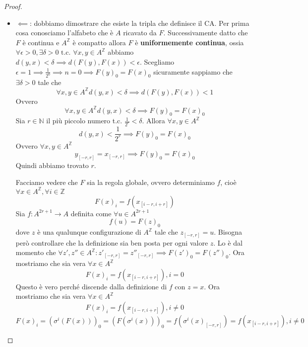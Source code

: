 \begin{teorema} 
\begin{proof}
\begin{itemize}
            Successivamente dimostriamo $F\circ \sigma = \sigma \circ F\implies F(\sigma(x)) = \sigma(F(x)), \forall x \in A^\mathbb{Z}$. 
            l'uguaglianza precedente può essere riscritta come $\forall x \in A^\mathbb{Z}, \forall i \in \mathbb{Z}, (F(\sigma(x)))_i =(\sigma(F(x)))_i$. 
            Possiamo notare che 
            $$(F(\sigma(x)))_i = f(\sigma(x)_{[i-r,i+r]})=f(x_{[i-r+1,i+r+1]})$$
            Inoltre 
            $$(\sigma(F(x)))_i =F(x)_{i+1} =f(x)_{[i+1-r,i+1+r]}$$
            Abbiamo dimostrato che commutano.
            \item $\impliedby$: dobbiamo dimostrare che esiste la tripla che definisce il CA.
            Per prima cosa conosciamo l'alfabeto che è $A$ ricavato da $F$. Successivamente
            datto che $F$ è continua e $A^\mathbb{Z}$ è compatto allora $F$ è \textbf{uniformemente 
            continua}, ossia $\forall\epsilon >0,\exists \delta > 0 \text{ t.c. } \forall x,y \in A^\mathbb{Z}$
            abbiamo $d(y,x)<\delta \implies d(F(y), F(x)) < \epsilon$. Scegliamo $\epsilon = 1\implies \frac{1}{2^0}\implies n=0\implies F(y)_0= F(x)_0$
            sicuramente sappiamo che $\exists \delta >0$ tale che $$\forall x,y \in A^\mathbb{Z} d(y,x)<\delta \implies d(F(y), F(x)) < 1$$
            Ovvero $$\forall x,y \in A^\mathbb{Z} d(y,x)<\delta \implies F(y)_0= F(x)_0$$
            Sia $r\in \mathbb{N}$ il più piccolo numero t.c. $\frac{1}{2^r}<\delta$.
            Allora $\forall x,y \in A^\mathbb{Z}$
            $$d(y,x)<\frac{1}{2^r} \implies F(y)_0= F(x)_0$$
            Ovvero $\forall x,y \in A^\mathbb{Z}$
            $$y_{[-r,r]} =x_{[-r,r]}\implies F(y)_0= F(x)_0$$
            Quindi abbiamo trovato $r$.

            Facciamo vedere che $F$ sia la regola globale, ovvero determiniamo $f$, cioè
            $\forall x\in A^\mathbb{Z},\forall i\in\mathbb{Z}$ 
            $$F(x)_i = f(x_{[i-r,i+r]})$$
            Sia $f: A^{2r+1}\rightarrow A$ definita come $\forall u \in A^{2r+1}$
            $$f(u) = F(z)_0$$ dove $z$ è una qualunque configurazione di 
            $A^\mathbb{Z}$ tale che $z_{[-r,r]} = u$. Bisogna però controllare che 
            la definizione sia ben posta per ogni valore $z$. Lo è dal momento che 
            $\forall z',z''\in A^\mathbb{Z}: z'_{[-r,r]} =  z''_{[-r,r]}\implies F(z')_0 = F(z'')_0$.
            Ora mostriamo che sia vera $\forall x\in A^\mathbb{Z}$ 
            $$F(x)_i = f(x_{[i-r,i+r]}), i = 0$$
            Questo è vero perché discende dalla definizione di $f$ con $z = x$.
            Ora mostriamo che sia vera $\forall x\in A^\mathbb{Z}$ 
            $$F(x)_i = f(x_{[i-r,i+r]}), i \ne 0$$
            $$F(x)_i = (\sigma^i(F(x)))_0=(F(\sigma^i(x)))_0=f(\sigma^i(x)_{[-r,r]}) = f(x_{[i-r,i+r]}), i \ne 0$$
        \end{itemize}
    \end{proof}
\end{teorema}

